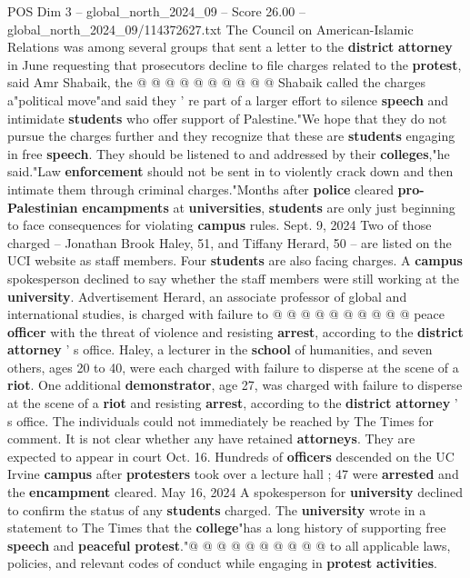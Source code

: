 \begin{textsample}{POS Dim 3 – global\_north\_2024\_09 – Score 26.00 – global\_north\_2024\_09/114372627.txt}
The Council on American-Islamic Relations was among several groups that sent a letter to the \textbf{district} \textbf{attorney} in June requesting that prosecutors decline to file charges related to the \textbf{protest}, said Amr Shabaik, the @ @ @ @ @ @ @ @ @ @ Shabaik called the charges a"political move"and said they ' re part of a larger effort to silence \textbf{speech} and intimidate \textbf{students} who offer support of Palestine."We hope that they do not pursue the charges further and they recognize that these are \textbf{students} engaging in free \textbf{speech}.
They should be listened to and addressed by their \textbf{colleges},"he said."Law \textbf{enforcement} should not be sent in to violently crack down and then intimate them through criminal charges."Months after \textbf{police} cleared \textbf{pro-Palestinian} \textbf{encampments} at \textbf{universities}, \textbf{students} are only just beginning to face consequences for violating \textbf{campus} rules.
Sept. 9, 2024 Two of those charged -- Jonathan Brook Haley, 51, and Tiffany Herard, 50 -- are listed on the UCI website as staff members.
Four \textbf{students} are also facing charges.
A \textbf{campus} spokesperson declined to say whether the staff members were still working at the \textbf{university}.
Advertisement Herard, an associate professor of global and international studies, is charged with failure to @ @ @ @ @ @ @ @ @ @ peace \textbf{officer} with the threat of violence and resisting \textbf{arrest}, according to the \textbf{district} \textbf{attorney} ' s office.
Haley, a lecturer in the \textbf{school} of humanities, and seven others, ages 20 to 40, were each charged with failure to disperse at the scene of a \textbf{riot}.
One additional \textbf{demonstrator}, age 27, was charged with failure to disperse at the scene of a \textbf{riot} and resisting \textbf{arrest}, according to the \textbf{district} \textbf{attorney} ' s office.
The individuals could not immediately be reached by The Times for comment.
It is not clear whether any have retained \textbf{attorneys}.
They are expected to appear in court Oct. 16.
Hundreds of \textbf{officers} descended on the UC Irvine \textbf{campus} after \textbf{protesters} took over a lecture hall ; 47 were \textbf{arrested} and the \textbf{encampment} cleared.
May 16, 2024 A spokesperson for \textbf{university} declined to confirm the status of any \textbf{students} charged.
The \textbf{university} wrote in a statement to The Times that the \textbf{college}"has a long history of supporting free \textbf{speech} and \textbf{peaceful} \textbf{protest}."@ @ @ @ @ @ @ @ @ @ to all applicable laws, policies, and relevant codes of conduct while engaging in \textbf{protest} \textbf{activities}.

\end{textsample}
